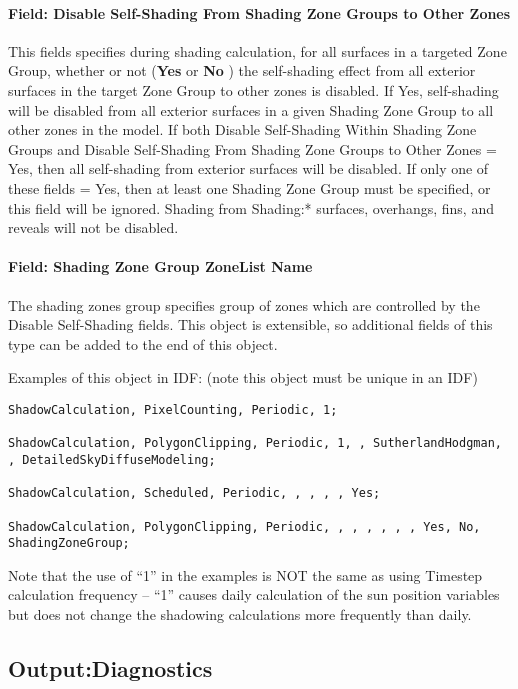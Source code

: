 \paragraph{Field: Disable Self-Shading From Shading Zone Groups to Other Zones}\label{field-self-disable-shading-between-zone-groups}
This fields specifies during shading calculation, for all surfaces in a targeted Zone Group, whether or not (\textbf{Yes} or \textbf{No} ) the self-shading effect from all exterior surfaces in the target Zone Group to other zones is disabled. If Yes, self-shading will be disabled from all exterior surfaces in a given Shading Zone Group to all other zones in the model. If both Disable Self-Shading Within Shading Zone Groups and Disable Self-Shading From Shading Zone Groups to Other Zones = Yes, then all self-shading from exterior surfaces will be disabled. If only one of these fields = Yes, then at least one Shading Zone Group must be specified, or this field will be ignored. Shading from Shading:* surfaces, overhangs, fins, and reveals will not be disabled.

\paragraph{Field: Shading Zone Group ZoneList Name}\label{field-shading-zone-group-zoneList-name}
The shading zones group specifies group of zones which are controlled by the Disable Self-Shading fields. This object is extensible, so additional fields of this type can be added to the end of this object.

Examples of this object in IDF: (note this object must be unique in an IDF)

\begin{lstlisting}
ShadowCalculation, PixelCounting, Periodic, 1;

ShadowCalculation, PolygonClipping, Periodic, 1, , SutherlandHodgman, , DetailedSkyDiffuseModeling;

ShadowCalculation, Scheduled, Periodic, , , , , Yes;

ShadowCalculation, PolygonClipping, Periodic, , , , , , , Yes, No, ShadingZoneGroup;
\end{lstlisting}

Note that the use of ``1'' in the examples is NOT the same as using Timestep calculation frequency -- ``1'' causes daily calculation of the sun position variables but does not change the shadowing calculations more frequently than daily.

\subsection{Output:Diagnostics}\label{outputdiagnostics}

